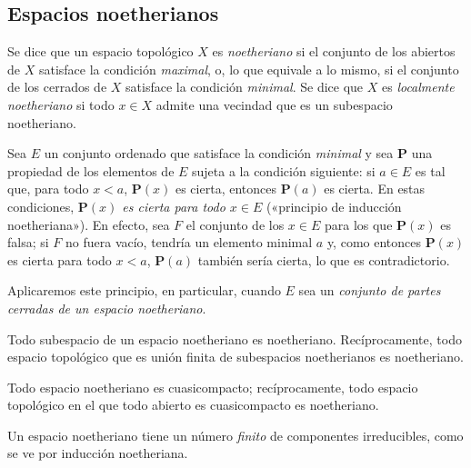 
\subsection{Espacios noetherianos}
\label{subsection:0.2.2-fr}

\begin{env}[2.2.1]
\label{0.2.2.1-fr}
Se dice que un espacio topológico $X$ es \emph{noetheriano} si el conjunto de los
abiertos de $X$ satisface la condición \emph{maximal}, o, lo que equivale a lo
mismo, si el conjunto de los cerrados de $X$ satisface la condición \emph{minimal}. Se
dice que $X$ es \emph{localmente noetheriano} si todo $x\in X$ admite una
vecindad que es un subespacio noetheriano.
\end{env}

\begin{env}[2.2.2]
\label{0.2.2.2-fr}
Sea $E$ un conjunto ordenado que satisface la condición \emph{minimal} y sea
$\boldsymbol{P}$ una propiedad de los elementos de $E$ sujeta a la condición siguiente: si
$a\in E$ es tal que, para todo $x<a$, $\boldsymbol{P}(x)$ es cierta, entonces $\boldsymbol{P}(a)$ es
cierta. En estas condiciones, \emph{$\boldsymbol{P}(x)$ es cierta para todo $x\in E$}
(«principio de inducción noetheriana»). En efecto, sea $F$ el conjunto de los
$x\in E$ para los que $\boldsymbol{P}(x)$ es falsa; si $F$ no fuera vacío, tendría un
elemento minimal $a$ y, como entonces $\boldsymbol{P}(x)$ es cierta para todo $x<a$, $\boldsymbol{P}(a)$
también sería cierta, lo que es contradictorio.

Aplicaremos este principio, en particular, cuando $E$ sea un \emph{conjunto
de partes cerradas de un espacio noetheriano}.
\end{env}

\begin{env}[2.2.3]
\label{0.2.2.3-fr}
Todo subespacio de un espacio noetheriano es noetheriano. Recíprocamente, todo
espacio topológico que es unión finita de subespacios noetherianos es noetheriano.
\end{env}

\begin{env}[2.2.4]
\label{0.2.2.4-fr}
Todo espacio noetheriano es cuasicompacto; recíprocamente, todo espacio topológico
en el que todo abierto es cuasicompacto es noetheriano.
\end{env}

\begin{env}[2.2.5]
\label{0.2.2.5-fr}
Un espacio noetheriano tiene un número \emph{finito} de componentes
irreducibles, como se ve por inducción noetheriana.
\end{env}
